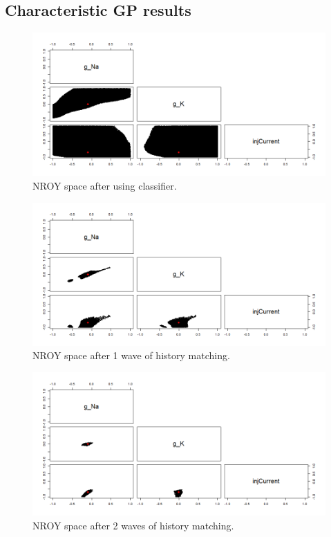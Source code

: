 \documentclass{article}
\begin{document}
\subsection{Characteristic GP results}
\begin{figure}
    \centering
    \includegraphics[width=\linewidth]{Example1/char0.png}
    \caption{NROY space after using classifier.}
    \label{fig:ex1-char0}
\end{figure}
\begin{figure}
    \centering
    \includegraphics[width=\linewidth]{Example1/char1.png}
    \caption{NROY space after 1 wave of history matching.}
    \label{fig:ex1-char1}
\end{figure}
\begin{figure}
    \centering
    \includegraphics[width=\linewidth]{Example1/char2.png}
    \caption{NROY space after 2 waves of history matching.}
    \label{fig:ex1-char2}
\end{figure}
\end{document}
